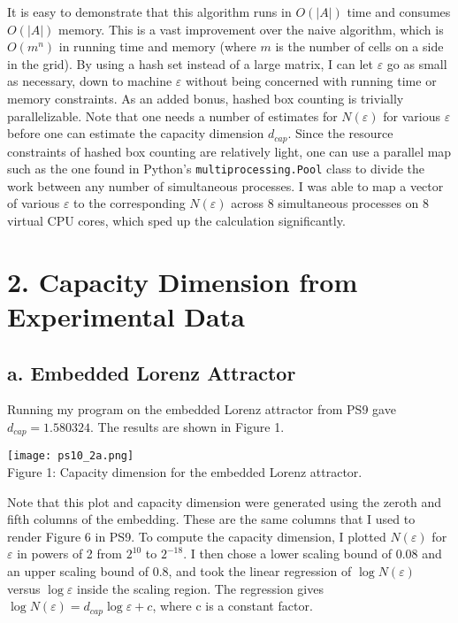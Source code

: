 \documentclass[12pt, letterpaper]{article}
\begin{document}
It is easy to demonstrate that this algorithm runs in $O(|A|)$ time and consumes
$O(|A|)$ memory. This is a vast improvement over the naive algorithm, which is
$O(m^n)$ in running time and memory (where $m$ is the number of cells on a side
in the grid). By using a hash set instead of a large matrix, I can let $\varepsilon$
go as small as necessary, down to machine $\varepsilon$ without being concerned 
with running time or memory constraints. As an added bonus, hashed box 
counting is trivially parallelizable. Note that one needs a number of estimates 
for $N(\varepsilon)$ for various $\varepsilon$ before one can estimate the 
capacity dimension $d_{cap}$. Since the resource constraints of hashed 
box counting are relatively light, one can use a parallel map such as the one
found in Python's \texttt{multiprocessing.Pool} class to divide the work between
any number of simultaneous processes. I was able to map a vector of various
$\varepsilon$ to the corresponding $N(\varepsilon)$ across 8 simultaneous 
processes on 8 virtual CPU cores, which sped up the calculation significantly.

\section*{2. Capacity Dimension from Experimental Data}
\subsection*{a. Embedded Lorenz Attractor}

Running my program on the embedded Lorenz attractor from PS9 gave 
$d_{cap} = 1.580324$. The results are shown in Figure 1.

\begin{center}
\texttt{[image: ps10\_2a.png]}
\\
Figure 1: Capacity dimension for the embedded Lorenz attractor.
\end{center}

Note that this plot and capacity dimension were generated using the zeroth and 
fifth columns of the embedding. These are the same columns that I used to render 
Figure 6 in PS9. To compute the capacity dimension, I plotted $N(\varepsilon)$
for $\varepsilon$ in powers of 2 from $2^{10}$ to $2^{-18}$. I then chose a 
lower scaling bound of 0.08 and an upper scaling bound of 0.8, and took the 
linear regression of $\log N(\varepsilon)$ versus $\log\varepsilon$ inside the
scaling region. The regression gives 
$\log N(\varepsilon) = d_{cap}\log\varepsilon + c$, where c is a constant factor.
\end{document}
